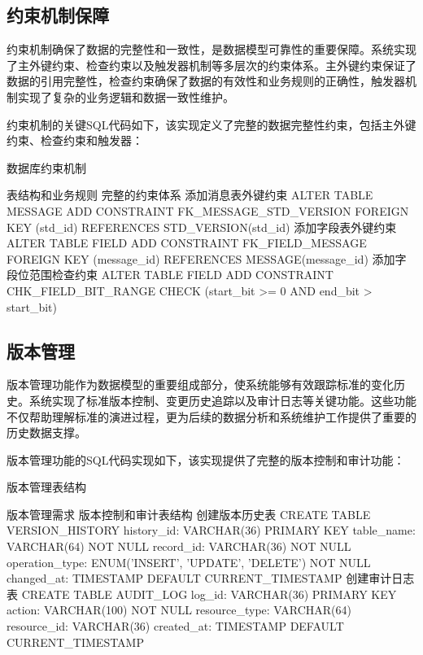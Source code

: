 \subsection{约束机制保障}

约束机制确保了数据的完整性和一致性，是数据模型可靠性的重要保障。系统实现了主外键约束、检查约束以及触发器机制等多层次的约束体系。主外键约束保证了数据的引用完整性，检查约束确保了数据的有效性和业务规则的正确性，触发器机制实现了复杂的业务逻辑和数据一致性维护。

约束机制的关键SQL代码如下，该实现定义了完整的数据完整性约束，包括主外键约束、检查约束和触发器：

\begin{algorithm}[H]
\caption{数据库约束机制}
\begin{algorithmic}[1]
\REQUIRE 表结构和业务规则
\ENSURE 完整的约束体系
\STATE 添加消息表外键约束
\STATE ALTER TABLE MESSAGE
\STATE ADD CONSTRAINT FK\_MESSAGE\_STD\_VERSION
\STATE FOREIGN KEY (std\_id) REFERENCES STD\_VERSION(std\_id)
\STATE 添加字段表外键约束
\STATE ALTER TABLE FIELD
\STATE ADD CONSTRAINT FK\_FIELD\_MESSAGE
\STATE FOREIGN KEY (message\_id) REFERENCES MESSAGE(message\_id)
\STATE 添加字段位范围检查约束
\STATE ALTER TABLE FIELD
\STATE ADD CONSTRAINT CHK\_FIELD\_BIT\_RANGE
\STATE CHECK (start\_bit >= 0 AND end\_bit > start\_bit)
\end{algorithmic}
\end{algorithm}
\subsection{版本管理}
版本管理功能作为数据模型的重要组成部分，使系统能够有效跟踪标准的变化历史。系统实现了标准版本控制、变更历史追踪以及审计日志等关键功能。这些功能不仅帮助理解标准的演进过程，更为后续的数据分析和系统维护工作提供了重要的历史数据支撑。

版本管理功能的SQL代码实现如下，该实现提供了完整的版本控制和审计功能：

\begin{algorithm}[H]
\caption{版本管理表结构}
\begin{algorithmic}[1]
\REQUIRE 版本管理需求
\ENSURE 版本控制和审计表结构
\STATE 创建版本历史表
\STATE CREATE TABLE VERSION\_HISTORY
\STATE history\_id: VARCHAR(36) PRIMARY KEY
\STATE table\_name: VARCHAR(64) NOT NULL
\STATE record\_id: VARCHAR(36) NOT NULL
\STATE operation\_type: ENUM('INSERT', 'UPDATE', 'DELETE') NOT NULL
\STATE changed\_at: TIMESTAMP DEFAULT CURRENT\_TIMESTAMP
\STATE 创建审计日志表
\STATE CREATE TABLE AUDIT\_LOG
\STATE log\_id: VARCHAR(36) PRIMARY KEY
\STATE action: VARCHAR(100) NOT NULL
\STATE resource\_type: VARCHAR(64)
\STATE resource\_id: VARCHAR(36)
\STATE created\_at: TIMESTAMP DEFAULT CURRENT\_TIMESTAMP
\end{algorithmic}
\end{algorithm}



